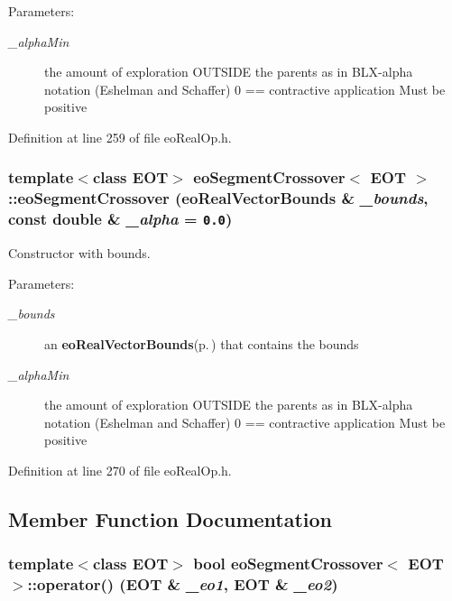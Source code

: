 \begin{Desc}
\item[Parameters:]
\begin{description}
\item[{\em \_\-alpha\-Min}]the amount of exploration OUTSIDE the parents as in BLX-alpha notation (Eshelman and Schaffer) 0 == contractive application Must be positive \end{description}
\end{Desc}


Definition at line 259 of file eo\-Real\-Op.h.
\subsubsection{\setlength{\rightskip}{0pt plus 5cm}template$<$class EOT$>$ {\bf eo\-Segment\-Crossover}$<$ {\bf EOT} $>$::{\bf eo\-Segment\-Crossover} ({\bf eo\-Real\-Vector\-Bounds} \& {\em \_\-bounds}, const double \& {\em \_\-alpha} = {\tt 0.0})\hspace{0.3cm}{\tt  [inline]}}\label{classeo_segment_crossover_a1}


Constructor with bounds. 

\begin{Desc}
\item[Parameters:]
\begin{description}
\item[{\em \_\-bounds}]an {\bf eo\-Real\-Vector\-Bounds}{\rm (p.\,\pageref{classeo_real_vector_bounds})} that contains the bounds \item[{\em \_\-alpha\-Min}]the amount of exploration OUTSIDE the parents as in BLX-alpha notation (Eshelman and Schaffer) 0 == contractive application Must be positive \end{description}
\end{Desc}


Definition at line 270 of file eo\-Real\-Op.h.

\subsection{Member Function Documentation}
\subsubsection{\setlength{\rightskip}{0pt plus 5cm}template$<$class EOT$>$ bool {\bf eo\-Segment\-Crossover}$<$ {\bf EOT} $>$::operator() ({\bf EOT} \& {\em \_\-eo1}, {\bf EOT} \& {\em \_\-eo2})\hspace{0.3cm}{\tt  [inline, virtual]}}\label{classeo_segment_crossover_a3}



